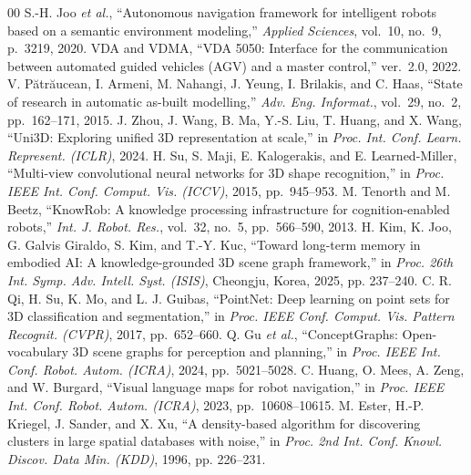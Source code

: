 \documentclass[conference]{IEEEtran}
\begin{document}
\begin{thebibliography}{00}
 S.-H. Joo \emph{et al.}, ``Autonomous navigation
framework for intelligent robots based on a semantic environment modeling,''
\emph{Applied Sciences}, vol.~10, no.~9, p.~3219, 2020.
 VDA and VDMA, ``VDA 5050: Interface for the communication
between automated guided vehicles (AGV) and a master control,'' ver.~2.0,
2022.
 V. P\u{a}tr\u{a}ucean, I. Armeni, M. Nahangi,
J. Yeung, I. Brilakis, and C. Haas, ``State of research in automatic
as-built modelling,'' \emph{Adv. Eng. Informat.}, vol.~29, no.~2,
pp.~162--171, 2015.
 J. Zhou, J. Wang, B. Ma, Y.-S. Liu, T. Huang, and
X. Wang, ``Uni3D: Exploring unified 3D representation at scale,'' in
\emph{Proc. Int. Conf. Learn. Represent. (ICLR)}, 2024.
 H. Su, S. Maji, E. Kalogerakis, and E.
Learned-Miller, ``Multi-view convolutional neural networks for 3D shape
recognition,'' in \emph{Proc. IEEE Int. Conf. Comput. Vis. (ICCV)}, 2015,
pp.~945--953.
 M. Tenorth and M. Beetz, ``KnowRob: A knowledge
processing infrastructure for cognition-enabled robots,'' \emph{Int. J.
Robot. Res.}, vol.~32, no.~5, pp.~566--590, 2013.
 H. Kim, K. Joo, G. Galvis Giraldo, S. Kim, and
T.-Y. Kuc, ``Toward long-term memory in embodied AI: A knowledge-grounded
3D scene graph framework,'' in \emph{Proc. 26th Int. Symp. Adv. Intell.
Syst. (ISIS)}, Cheongju, Korea, 2025, pp. 237--240.
 C. R. Qi, H. Su, K. Mo, and L. J. Guibas, ``PointNet: Deep
learning on point sets for 3D classification and segmentation,'' in
\emph{Proc. IEEE Conf. Comput. Vis. Pattern Recognit. (CVPR)}, 2017,
pp.~652--660.
 Q. Gu \emph{et al.}, ``ConceptGraphs:
Open-vocabulary 3D scene graphs for perception and planning,'' in
\emph{Proc. IEEE Int. Conf. Robot. Autom. (ICRA)}, 2024, pp.~5021--5028.
 C. Huang, O. Mees, A. Zeng, and W. Burgard,
``Visual language maps for robot navigation,'' in \emph{Proc. IEEE Int.
Conf. Robot. Autom. (ICRA)}, 2023, pp.~10608--10615.
 M. Ester, H.-P. Kriegel, J. Sander, and X. Xu, ``A
density-based algorithm for discovering clusters in large spatial databases
with noise,'' in \emph{Proc. 2nd Int. Conf. Knowl. Discov. Data Min.
(KDD)}, 1996, pp. 226--231.
\end{thebibliography}
\end{document}
